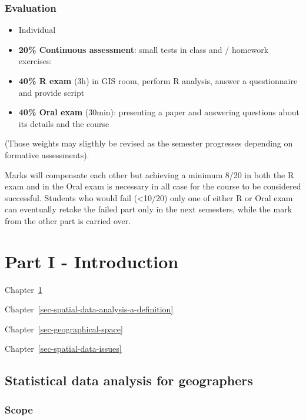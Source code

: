 \documentclass[
  letterpaper,
  DIV=11,
  numbers=noendperiod]{scrreprt}
\begin{document}
\section*{Evaluation}\label{evaluation}


\begin{itemize}
\item
  Individual
\item
  \textbf{20\% Continuous assessment}: small tests in class and /
  homework exercises:
\item
  \textbf{40\% R exam} (3h) in GIS room, perform R analysis, answer a
  questionnaire and provide script
\item
  \textbf{40\% Oral exam} (30min): presenting a paper and answering
  questions about its details and the course
\end{itemize}

(Those weights may sligthly be revised as the semester progresses
depending on formative assessments).

Marks will compensate each other but achieving a minimum 8/20 in both
the R exam and in the Oral exam is necessary in all case for the course
to be considered successful. Students who would fail (\textless10/20)
only one of either R or Oral exam can eventually retake the failed part
only in the next semesters, while the mark from the other part is
carried over.

\part{Part I - Introduction}

Chapter~\ref{sec-statistical-data-analysis-for-geographers}

Chapter~\ref{sec-spatial-data-analysis-a-definition}

Chapter~\ref{sec-geographical-space}

Chapter~\ref{sec-spatial-data-issues}

\chapter{Statistical data analysis for
geographers}\label{sec-statistical-data-analysis-for-geographers}

\section{Scope}\label{sec-scope}
\end{document}
